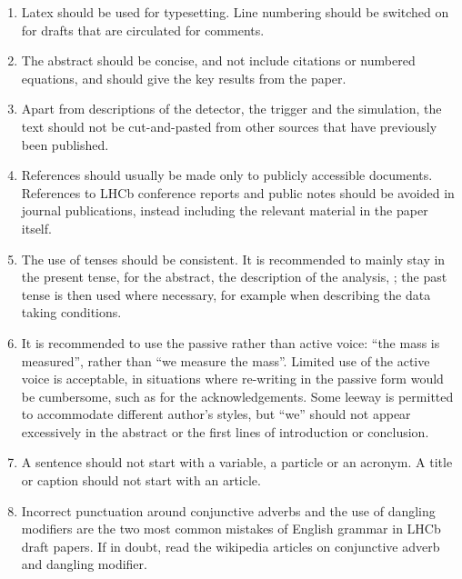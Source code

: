 \begin{enumerate}
\item Latex should be used for typesetting. Line numbering should be
  switched on for drafts that are circulated for comments.

\item The abstract should be concise, and not include citations or
  numbered equations, and should give the key results from the paper.

\item Apart from descriptions of the detector, the trigger and the
  simulation, the text should not be cut-and-pasted from other sources
  that have previously been published.

\item References should usually be made only to publicly accessible
  documents. References to LHCb conference reports and public notes
  should be avoided in journal publications, instead including the
  relevant material in the paper itself.

\item The use of tenses should be consistent. It is recommended to
  mainly stay in the present tense, for the abstract, the description
  of the analysis, \etc; the past tense is then used where necessary,
  for example when describing the data taking conditions.

\item It is recommended to use the passive rather than active voice:
  ``the mass is measured'', rather than ``we measure the mass''.
  Limited use of the active voice is acceptable, in situations where
  re-writing in the passive form would be cumbersome, such as for the
  acknowledgements.  Some leeway is permitted to accommodate different
  author's styles, but ``we'' should not appear excessively in the
  abstract or the first lines of introduction or conclusion.

\item A sentence should not start with a variable, a particle or an acronym. A title or caption should not start with an article. 

\item Incorrect punctuation around conjunctive adverbs and the use of 
dangling modifiers are the two most common mistakes of English grammar
in LHCb draft papers. If in doubt, read the wikipedia articles on 
conjunctive adverb and dangling modifier.  

\end{enumerate}
